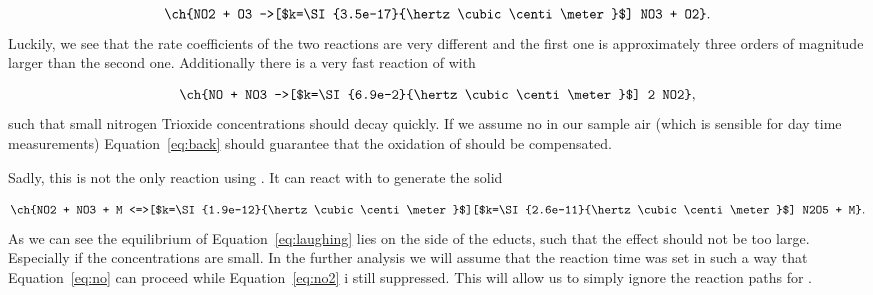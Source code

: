 \begin{align}
  \ch{NO2 + O3 ->[$k=\SI{3.5e-17}{\hertz\cubic\centi\meter}$] NO3
  + O2}. \label{eq:no2}
\end{align}
Luckily, we see that the rate coefficients of the two reactions are
very different and the first one is approximately three orders of
magnitude larger than the second one. Additionally there is a very
fast reaction of  with 

\begin{align}
  \ch{NO + NO3 ->[$k=\SI{6.9e-2}{\hertz\cubic\centi\meter}$] 2 NO2},\label{eq:back}
\end{align}
such that small nitrogen Trioxide concentrations should decay
quickly. If we assume no  in our sample air (which is sensible
for day time measurements) Equation~\eqref{eq:back} should guarantee
that the oxidation of  should be compensated. 

Sadly, this is not the only reaction using . It can react
with  to generate the solid 

\begin{align}
  \ch{NO2 + NO3 + M
  <=>[$k=\SI{1.9e-12}{\hertz\cubic\centi\meter}$][$k=\SI{2.6e-11}{\hertz\cubic\centi\meter}$]
  N2O5 + M}. \label{eq:laughing}
\end{align}
As we can see the equilibrium of Equation~\eqref{eq:laughing} lies on the
side of the educts, such that the effect should not be too large. Especially
if the  concentrations are small. In the further
analysis we will assume that the reaction time was set in such a way
that Equation~\eqref{eq:no} can proceed while Equation~\eqref{eq:no2}
i still suppressed. This will allow us to simply ignore the reaction
paths for . 

